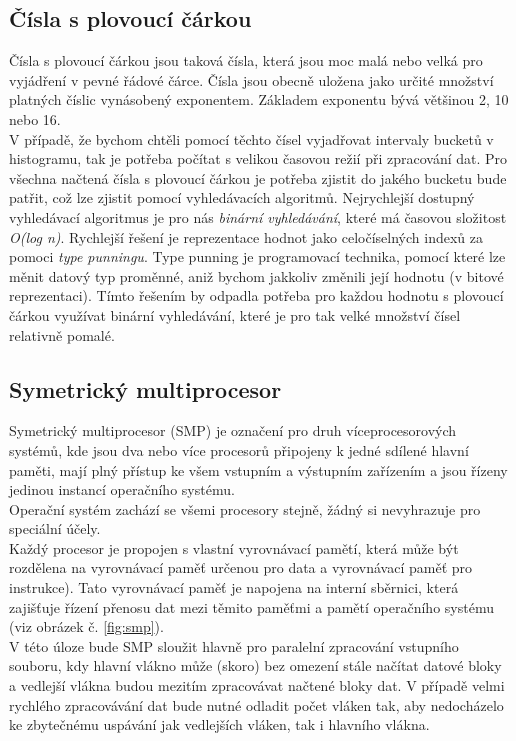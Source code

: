 \documentclass[12pt, a4paper]{article}
\begin{document}
\subsection{Čísla s plovoucí čárkou}
Čísla s plovoucí čárkou jsou taková čísla, která jsou moc malá nebo velká pro vyjádření v pevné řádové čárce. Čísla jsou obecně uložena jako určité množství platných číslic vynásobený exponentem. Základem exponentu bývá většinou 2, 10 nebo 16. \\
\indent V případě, že bychom chtěli pomocí těchto čísel vyjadřovat intervaly bucketů v histogramu, tak je potřeba počítat s velikou časovou režií při zpracování dat. Pro všechna načtená čísla s plovoucí čárkou je potřeba zjistit do jakého bucketu bude patřit, což lze zjistit pomocí vyhledávacích algoritmů. Nejrychlejší dostupný vyhledávací algoritmus je pro nás \textit{binární vyhledávání}, které má časovou složitost \textit{O(log n)}.
\indent Rychlejší řešení je reprezentace hodnot jako celočíselných indexů za pomoci \textit{type punningu}. Type punning je programovací technika, pomocí které lze měnit datový typ proměnné, aniž bychom jakkoliv změnili její hodnotu (v bitové reprezentaci). Tímto řešením by odpadla potřeba pro každou hodnotu s plovoucí čárkou využívat binární vyhledávání, které je pro tak velké množství čísel relativně pomalé.

\subsection{Symetrický multiprocesor}
Symetrický multiprocesor (SMP) je označení pro druh víceprocesorových systémů, kde jsou dva nebo více procesorů připojeny k jedné sdílené hlavní paměti, mají plný přístup ke všem vstupním a výstupním zařízením a jsou řízeny jedinou instancí operačního systému. \\
\indent Operační systém zachází se všemi procesory stejně, žádný si nevyhrazuje pro speciální účely. \\
\indent Každý procesor je propojen s vlastní vyrovnávací pamětí, která může být rozdělena na vyrovnávací paměť určenou pro data a vyrovnávací paměť pro instrukce). Tato vyrovnávací paměť je napojena na interní sběrnici, která zajišťuje řízení přenosu dat mezi těmito paměťmi a pamětí operačního systému (viz obrázek č. \ref{fig:smp}).\\
\indent V této úloze bude SMP sloužit hlavně pro paralelní zpracování vstupního souboru, kdy hlavní vlákno může (skoro) bez omezení stále načítat datové bloky a vedlejší vlákna budou mezitím zpracovávat načtené bloky dat. V případě velmi rychlého zpracovávání dat bude nutné odladit počet vláken tak, aby nedocházelo ke zbytečnému uspávání jak vedlejších vláken, tak i hlavního vlákna.
\end{document}
